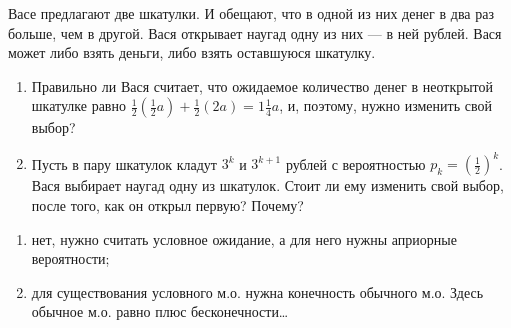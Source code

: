 \begin{problem}\par
\begin{source}
\cite{binmore:fg}
\end{source}
Васе предлагают две шкатулки. И обещают, что в одной из них денег в два раз больше, чем в другой. Вася открывает наугад одну из них --- в ней  рублей. Вася может либо взять деньги, либо взять оставшуюся шкатулку.
\begin{enumerate}
\item Правильно ли Вася считает, что ожидаемое количество денег в неоткрытой шкатулке равно  $\frac{1}{2} \left(\frac{1}{2} a\right)+\frac{1}{2} \left(2a\right)=1\frac{1}{4} a$, и, поэтому, нужно изменить свой выбор?\par
\item Пусть в пару шкатулок кладут  $3^{k} $  и  $3^{k+1} $  рублей с вероятностью  $p_{k} =\left(\frac{1}{2} \right)^{k} $. Вася выбирает наугад одну из шкатулок. Стоит ли ему изменить свой выбор, после того, как он открыл первую? Почему?\par
\end{enumerate}


\begin{sol}
\begin{enumerate}
\item 
 нет, нужно считать условное ожидание, а для него нужны априорные вероятности;
 \item для существования условного м.о. нужна конечность обычного м.о. Здесь обычное м.о. равно плюс бесконечности\ldots
\end{enumerate}
\end{sol}
\end{problem}




